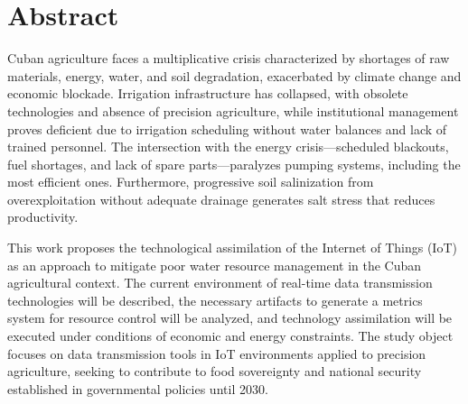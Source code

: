 \section*{Abstract}

Cuban agriculture faces a multiplicative crisis characterized by shortages of raw materials, energy, water, and soil degradation, exacerbated by climate change and economic blockade. Irrigation infrastructure has collapsed, with obsolete technologies and absence of precision agriculture, while institutional management proves deficient due to irrigation scheduling without water balances and lack of trained personnel. The intersection with the energy crisis—scheduled blackouts, fuel shortages, and lack of spare parts—paralyzes pumping systems, including the most efficient ones. Furthermore, progressive soil salinization from overexploitation without adequate drainage generates salt stress that reduces productivity.

This work proposes the technological assimilation of the Internet of Things (IoT) as an approach to mitigate poor water resource management in the Cuban agricultural context. The current environment of real-time data transmission technologies will be described, the necessary artifacts to generate a metrics system for resource control will be analyzed, and technology assimilation will be executed under conditions of economic and energy constraints. The study object focuses on data transmission tools in IoT environments applied to precision agriculture, seeking to contribute to food sovereignty and national security established in governmental policies until 2030.


